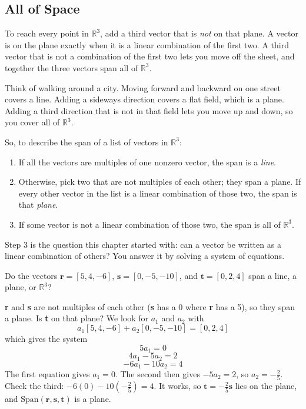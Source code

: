 \subsection{All of Space}
To reach every point in $\mathbb{R}^3$, add a third vector that is \emph{not} on
that plane. A vector is on the plane exactly when it is a linear combination of
the first two. A third vector that is not a combination of the first two lets
you move off the sheet, and together the three vectors span all of $\mathbb{R}^3$.

Think of walking around a city. Moving forward and backward on one street covers a line. Adding a sideways direction covers a flat field, which is a plane. Adding a third direction that is not in that field lets you move up and down, so you cover all of $\mathbb{R}^3$.

So, to describe the span of a list of vectors in $\mathbb{R}^3$:
\begin{enumerate}
\item If all the vectors are multiples of one nonzero vector, the span is a \textit{line}.
\item Otherwise, pick two that are not multiples of each other; they span a plane.
If every other vector in the list is a linear combination of those two, the span
is that \textit{plane}.
\item If some vector is not a linear combination of those two, the span is all of $\mathbb{R}^3$.
\end{enumerate}
Step 3 is the question this chapter started with: can a vector be written as a
linear combination of others? You answer it by solving a system of equations.

\begin{Worked}
\begin{Problem}
Do the vectors $\mathbf{r} = \left[ 5, 4, -6 \right]$,
$\mathbf{s} = \left[ 0, -5, -10 \right]$, and $\mathbf{t} = \left[ 0, 2, 4 \right]$
span a line, a plane, or $\mathbb{R}^3$?
\end{Problem}
\begin{Solution}
\textbf{r} and \textbf{s} are not multiples of each other
(\textbf{s} has a 0 where \textbf{r} has a 5), so they span a plane. Is
\textbf{t} on that plane? We look for $a_1$ and $a_2$ with
$$a_1 \left[5, 4, -6 \right] + a_2 \left[ 0, -5, -10 \right] = \left[ 0, 2, 4 \right]$$
which gives the system
$$5a_1 = 0$$
$$4a_1 - 5a_2 = 2$$
$$-6a_1 - 10a_2 = 4$$
The first equation gives $a_1 = 0$. The second then gives $-5a_2 = 2$, so
$a_2 = -\frac{2}{5}$. Check the third: $-6(0) - 10\left(-\frac{2}{5}\right) = 4$. It
works, so $\mathbf{t} = -\frac{2}{5}\mathbf{s}$ lies on the plane, and
$\text{Span}(\mathbf{r}, \mathbf{s}, \mathbf{t})$ is a plane.
\end{Solution}
\end{Worked}

